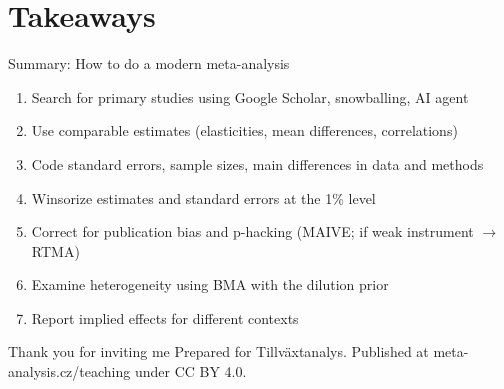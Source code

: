 \documentclass{beamer} %
\begin{document}
\section{Takeaways}



\begin{frame}{Summary: How to do a modern meta-analysis}
\begin{enumerate}

	\item Search for primary studies using Google Scholar, snowballing, AI agent
	\item Use comparable estimates (elasticities, mean differences, correlations)
	\item Code standard errors, sample sizes, main differences in data and methods
	\item Winsorize estimates and standard errors at the 1\% level
	\item Correct for publication bias and p-hacking (MAIVE; if weak instrument $\rightarrow$ RTMA)
	\item Examine heterogeneity using BMA with the dilution prior
	\item Report implied effects for different contexts
	
\end{enumerate}
\end{frame}


\begin{frame}{Thank you for inviting me}
Prepared for Tillv\"{a}xtanalys. Published at meta-analysis.cz/teaching under CC BY 4.0.
\end{frame}
\end{document}
